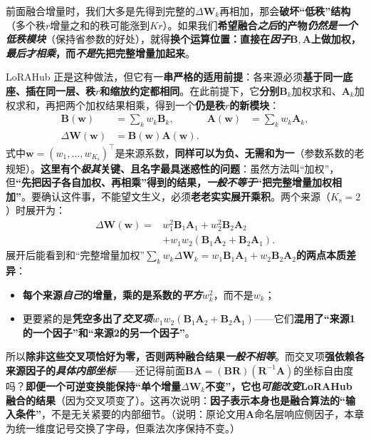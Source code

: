 前面融合增量时，我们大多是先得到完整的$\Delta\bm{W}_k$再相加，那会\textbf{破坏“低秩”结构}（多个秩$r$增量之和的秩可能涨到$Kr$）。如果我们\textbf{希望融合\emph{之后}的产物\emph{仍然是一个低秩模块}}（保持省参数的好处），就得\textbf{换个运算位置：直接在\emph{因子}$\bm{B},\bm{A}$上做加权，\emph{最后才相乘}，而\emph{不是}先把完整增量加起来}。

LoRAHub 正是这种做法，但它有一\textbf{串严格的适用前提}：各来源必须\textbf{基于同一底座、插在同一层、秩$r$和缩放约定都相同}。在此前提下，它\textbf{分别}$\bm{B}_k$加权求和、$\bm{A}_k$加权求和，再把两个加权结果相乘，得到一个\textbf{仍是秩$r$的新模块}：
\begin{equation}
  \begin{aligned}
    \bm{B}(\bm{w})&=\sum_k w_k\bm{B}_k,&
    \bm{A}(\bm{w})&=\sum_k w_k\bm{A}_k,\\
    \Delta\bm{W}(\bm{w})&=\bm{B}(\bm{w})\bm{A}(\bm{w}).
  \end{aligned}
  \label{eq:ket-integration-lorahub}
\end{equation}
式中$\bm{w}=(w_1,\ldots,w_{K_{\mathrm{s}}})^\top$是来源系数，\textbf{同样可以为负、无需和为一}（参数系数的老规矩）。\textbf{这里有个\emph{极其}关键、且名字最具迷惑性的问题}：虽然方法叫“加权”，但\textbf{“先把因子各自加权、再相乘”得到的结果，\emph{一般不等于}“把完整增量加权相加”}。要确认这件事，不能望文生义，必须\textbf{老老实实展开乘积}。两个来源（$K_{\mathrm{s}}=2$）时展开为：
\begin{equation}
  \begin{aligned}
    \Delta\bm{W}(\bm{w})
      ={}&w_1^2\bm{B}_1\bm{A}_1+w_2^2\bm{B}_2\bm{A}_2\\
       &+w_1w_2(\bm{B}_1\bm{A}_2+\bm{B}_2\bm{A}_1).
  \end{aligned}
  \label{eq:ket-integration-lorahub-cross-terms}
\end{equation}
展开后能看到和“完整增量加权”$\sum_k w_k\Delta\bm{W}_k=w_1\bm{B}_1\bm{A}_1+w_2\bm{B}_2\bm{A}_2$\textbf{的两点本质差异}：
\begin{itemize}\item \textbf{每个来源\emph{自己}的增量，乘的是系数的\emph{平方}}$w_k^2$，而不是$w_k$；\item 更要紧的是\textbf{凭空多出了\emph{交叉项}}$w_1w_2(\bm{B}_1\bm{A}_2+\bm{B}_2\bm{A}_1)$——它们\textbf{混用了“来源1的一个因子”和“来源2的另一个因子”}。\end{itemize}
所以\textbf{除非这些交叉项恰好为零，否则两种融合结果\emph{一般不相等}}。而交叉项\textbf{强依赖各来源因子的\emph{具体内部坐标}}——还记得前面$\bm{B}\bm{A}=(\bm{B}\bm{R})(\bm{R}^{-1}\bm{A})$的坐标自由度吗？\textbf{即便一个可逆变换能保持“单个增量$\Delta\bm{W}_k$不变”，它也\emph{可能改变}LoRAHub 融合的结果}（因为交叉项变了）。这再次说明：\textbf{因子表示本身也是融合算法的“输入条件”}，不是无关紧要的内部细节。（说明：原论文用$\bm{A}$命名层响应侧因子，本章为统一维度记号交换了字母，但乘法次序保持不变。）

